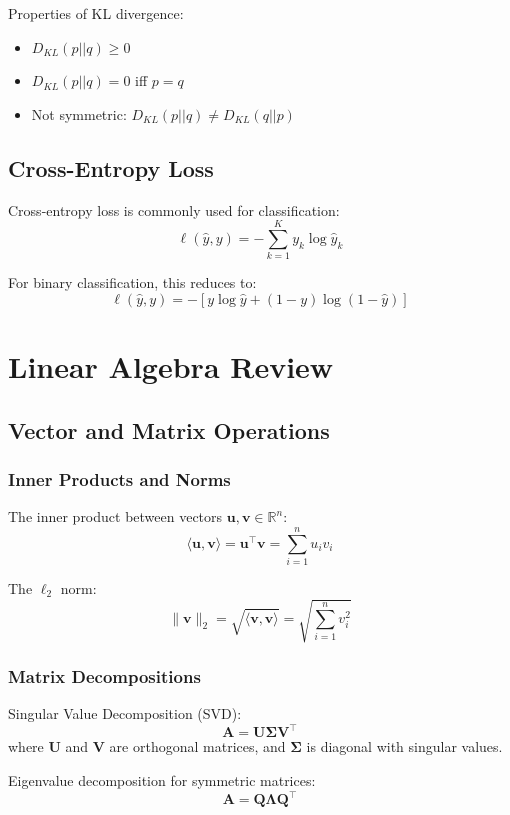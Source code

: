 \documentclass{article}
\begin{document}
Properties of KL divergence:
\begin{itemize}
\item $D_{KL}(p||q) \geq 0$
\item $D_{KL}(p||q) = 0$ iff $p = q$
\item Not symmetric: $D_{KL}(p||q) \neq D_{KL}(q||p)$
\end{itemize}

\subsection{Cross-Entropy Loss}

Cross-entropy loss is commonly used for classification:
\[
\ell(\hat{y}, y) = -\sum_{k=1}^K y_k \log \hat{y}_k
\]

For binary classification, this reduces to:
\[
\ell(\hat{y}, y) = -[y \log \hat{y} + (1-y) \log (1-\hat{y})]
\]

\section{Linear Algebra Review}

\subsection{Vector and Matrix Operations}

\subsubsection{Inner Products and Norms}

The inner product between vectors $\mathbf{u}, \mathbf{v} \in \mathbb{R}^n$:
\[
\langle \mathbf{u}, \mathbf{v} \rangle = \mathbf{u}^\top \mathbf{v} = \sum_{i=1}^n u_i v_i
\]

The $\ell_2$ norm:
\[
\|\mathbf{v}\|_2 = \sqrt{\langle \mathbf{v}, \mathbf{v} \rangle} = \sqrt{\sum_{i=1}^n v_i^2}
\]

\subsubsection{Matrix Decompositions}

Singular Value Decomposition (SVD):
\[
\mathbf{A} = \mathbf{U} \mathbf{\Sigma} \mathbf{V}^\top
\]
where $\mathbf{U}$ and $\mathbf{V}$ are orthogonal matrices, and
$\mathbf{\Sigma}$ is diagonal with singular values.

Eigenvalue decomposition for symmetric matrices:
\[
\mathbf{A} = \mathbf{Q} \mathbf{\Lambda} \mathbf{Q}^\top
\]
\end{document}
